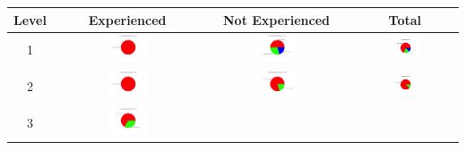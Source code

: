 \begin{table}
\centering
\begin{tabular}{ |c|c|c|c| }
     \hline
     Level & Experienced& Not Experienced & Total\\ 
     \hline
    1
    & \includegraphics[width= 0.3\textwidth]{img/L1_exp.png}
    & \includegraphics[width= 0.3\textwidth]{img/L1_NE.png} 
    & \includegraphics[width= 0.3\textwidth]{img/L1_all.png}\\  
    2
    & \includegraphics[width= 0.3\textwidth]{img/L2_exp.png}
    & \includegraphics[width= 0.3\textwidth]{img/L2_NE.png} 
    & \includegraphics[width= 0.3\textwidth]{img/L2_all.png}\\  
    3
    & \includegraphics[width= 0.3\textwidth]{img/L3_exp.png}

\end{tabular}
\end{table}
